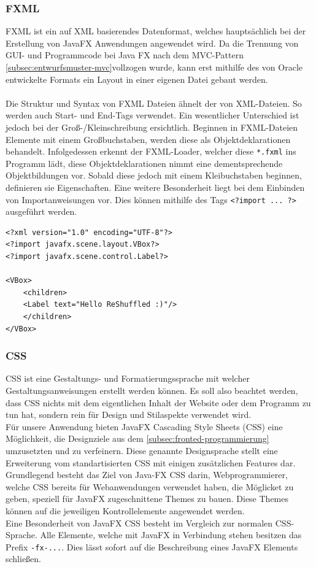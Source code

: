 \subsubsection{FXML}
FXML ist ein auf XML basierendes Datenformat, welches hauptsächlich bei der Erstellung von JavaFX Anwendungen angewendet wird.
Da die Trennung von GUI- und Programmcode bei Java FX nach dem MVC-Pattern \autoref{subsec:entwurfsmuster-mvc}vollzogen wurde, kann erst mithilfe des von Oracle entwickelte Formats ein Layout in einer eigenen Datei gebaut werden.\\\\
Die Struktur und Syntax von FXML Dateien ähnelt der von XML-Dateien.
So werden auch Start- und End-Tags verwendet.
Ein wesentlicher Unterschied ist jedoch bei der Groß-/Kleinschreibung ersichtlich.
Beginnen in FXML-Dateien Elemente mit einem Großbuchstaben, werden diese als Objektdeklarationen behandelt.
Infolgedessen erkennt der FXML-Loader, welcher diese \lstinline{*.fxml} ins Programm lädt, diese Objektdeklarationen nimmt eine dementsprechende Objektbildungen vor.
Sobald diese jedoch mit einem Kleibuchstaben beginnen, definieren sie Eigenschaften.
Eine weitere Besonderheit liegt bei dem Einbinden von Importanweisungen vor.
Dies können mithilfe des Tags \lstinline{<?import ... ?>} ausgeführt werden.\\
\begin{lstlisting}[caption=FXML-Codebeispiel,label=fxmlExample]
<?xml version="1.0" encoding="UTF-8"?>
<?import javafx.scene.layout.VBox?>
<?import javafx.scene.control.Label?>

<VBox>
    <children>
    <Label text="Hello ReShuffled :)"/>
    </children>
</VBox>
\end{lstlisting}

\subsubsection{CSS}\label{sssec:CSS}
CSS ist eine Gestaltungs- und Formatierungssprache mit welcher Gestaltungsanweisungen erstellt werden können.
Es soll also beachtet werden, dass CSS nichts mit dem eigentlichen Inhalt der Website oder dem Programm zu tun hat, sondern rein für Design und Stilaspekte verwendet wird.\\
 Für unsere Anwendung bieten JavaFX Cascading Style Sheets (CSS) eine Möglichkeit, die Designziele aus dem \autoref{subsec:fronted-programmierung} umzusetzten und zu verfeinern.
Diese genannte Designsprache stellt eine Erweiterung vom standartisierten CSS mit einigen zusätzlichen Features dar.\\
Grundlegend besteht das Ziel von Java-FX CSS darin, Webprogrammierer, welche CSS bereits für Webanwendungen verwendet haben, die Möglicket zu geben, speziell für JavaFX zugeschnittene Themes zu bauen.
Diese Themes können auf die jeweiligen Kontrollelemente angewendet werden.\\
Eine Besonderheit von JavaFX CSS besteht im Vergleich zur normalen CSS-Sprache.
Alle Elemente, welche mit JavaFX in Verbindung stehen besitzen das Prefix \lstinline{-fx-...}.
Dies lässt sofort auf die Beschreibung eines JavaFX Elements schließen.
